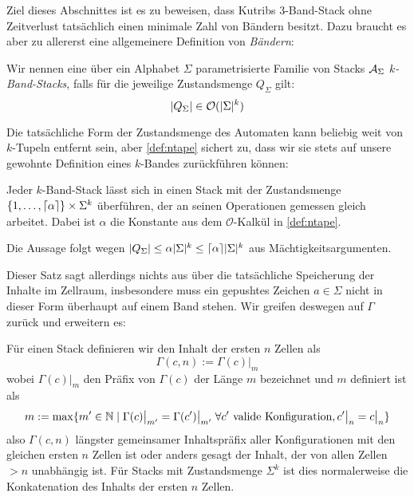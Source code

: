 \documentclass{article}
\begin{document}
Ziel dieses Abschnittes ist es zu beweisen, dass Kutribs 3-Band-Stack ohne Zeitverlust tatsächlich einen minimale Zahl von Bändern besitzt. Dazu braucht es aber zu allererst eine allgemeinere Definition von \emph{Bändern}:
\begin{definition}
    Wir nennen eine über ein Alphabet $\Sigma$ parametrisierte Familie von Stacks $\mathcal{A}_\Sigma$ \emph{$k$-Band-Stacks}, falls für die jeweilige Zustandsmenge $Q_\Sigma$ gilt:
    \begin{equation}
        \lvert Q_\Sigma\rvert \in \mathcal{O}(\lvert\Sigma\rvert^k) \label{def:ntape}
    \end{equation}
\end{definition}

Die tatsächliche Form der Zustandsmenge des Automaten kann beliebig weit von $k$-Tupeln entfernt sein, aber \eqref{def:ntape} sichert zu, dass wir sie stets auf unsere gewohnte Definition eines $k$-Bandes zurückführen können:

\begin{satz}
    \label{thm:tape-hom}
    Jeder $k$-Band-Stack lässt sich in einen Stack mit der Zustandsmenge $\{1,\dots,\lceil\alpha\rceil\} \times \Sigma^k$ überführen, der an seinen Operationen gemessen gleich arbeitet. Dabei ist $\alpha$ die Konstante aus dem $\mathcal{O}$-Kalkül in \eqref{def:ntape}.

    \begin{beweis}
        Die Aussage folgt wegen $\lvert Q_\Sigma\rvert \leq \alpha \lvert\Sigma\rvert^k \leq \lceil\alpha\rceil \lvert\Sigma\rvert^k$ aus Mächtigkeitsargumenten.
    \end{beweis}
\end{satz}

Dieser Satz sagt allerdings nichts aus über die tatsächliche Speicherung der Inhalte im Zellraum, insbesondere muss ein gepushtes Zeichen $a \in \Sigma$ nicht in dieser Form überhaupt auf einem Band stehen. Wir greifen deswegen auf $\Gamma$ zurück und erweitern es:

\begin{definition}
    Für einen Stack definieren wir den Inhalt der ersten $n$ Zellen als
    \[ \Gamma(c,n) := \Gamma(c) \big|_m \]
    wobei $\Gamma(c) \big|_m$ den Präfix von $\Gamma(c)$ der Länge $m$ bezeichnet und $m$ definiert ist als
    \[ m := \max \{m' \in \mathbb{N} \mid \Gamma(c) \big|_{m'} = \Gamma(c') \big|_{m'} \;\forall c' \text{ valide Konfiguration}, c' \big|_n = c \big|_n \} \]
    also $\Gamma(c,n)$ längster gemeinsamer Inhaltspräfix aller Konfigurationen mit den gleichen ersten $n$ Zellen ist oder anders gesagt der Inhalt, der von allen Zellen $> n$ unabhängig ist.
    Für Stacks mit Zustandsmenge $\Sigma^k$ ist dies normalerweise die Konkatenation des Inhalts der ersten $n$ Zellen.
\end{definition}
\end{document}
